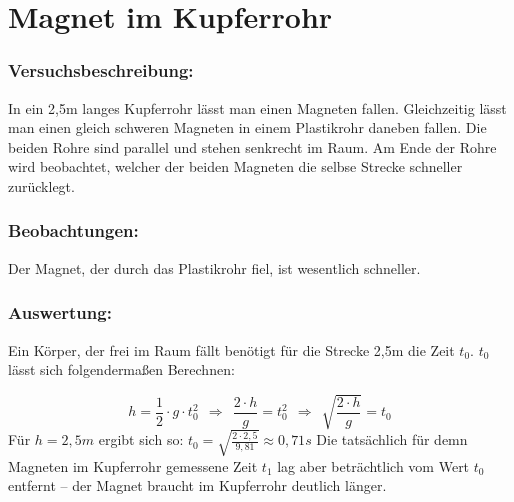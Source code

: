 % 
% 
% 
% 


		\section{Magnet im Kupferrohr}

		\subsubsection*{Versuchsbeschreibung:}
In ein 2,5m langes Kupferrohr lässt man einen Magneten fallen. Gleichzeitig lässt man einen gleich schweren Magneten in einem Plastikrohr daneben fallen. Die beiden Rohre sind parallel und stehen senkrecht im Raum. Am Ende der Rohre wird beobachtet, welcher der beiden Magneten die selbse Strecke schneller zurücklegt.		
		
		\subsubsection*{Beobachtungen:}
Der Magnet, der durch das Plastikrohr fiel, ist wesentlich schneller. 
		
		\subsubsection*{Auswertung:}
Ein Körper, der frei im Raum fällt benötigt für die Strecke 2,5m die Zeit \(t_0\). \(t_0\) lässt sich folgendermaßen Berechnen:

\begin{equation}
h = \frac{1}{2} \cdot g \cdot t_0^2 ~~\Rightarrow~~
\frac{2 \cdot h}{g} = t_0^2 ~~\Rightarrow~~
\sqrt{\frac{2 \cdot h}{g}} = t_0 
\end{equation}
Für \(h = 2,5m\) ergibt sich so: \(t_0 = \sqrt{\frac{2 \cdot 2,5}{9,81}} \approx 0,71s\) 
Die tatsächlich für demn Magneten im Kupferrohr gemessene Zeit \(t_1\) lag aber beträchtlich vom Wert \(t_0\) entfernt -- der Magnet braucht im Kupferrohr deutlich länger.

